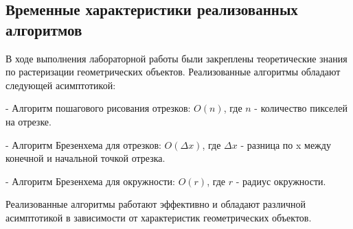 \documentclass{article}
\begin{document}
    \subsection{Временные характеристики реализованных алгоритмов}
    В ходе выполнения лабораторной работы были закреплены теоретические знания по растеризации геометрических объектов. Реализованные алгоритмы обладают следующей асимптотикой:

    - Алгоритм пошагового рисования отрезков: \(O(n)\), где \(n\) - количество пикселей на отрезке.

    - Алгоритм Брезенхема для отрезков: \(O(\Delta x)\), где \(\Delta x\) - разница по x между конечной и начальной точкой отрезка.

    - Алгоритм Брезенхема для окружности: \(O(r)\), где \(r\) - радиус окружности.

    Реализованные алгоритмы работают эффективно и обладают различной асимптотикой в зависимости от характеристик геометрических объектов.
    
\end{document}
